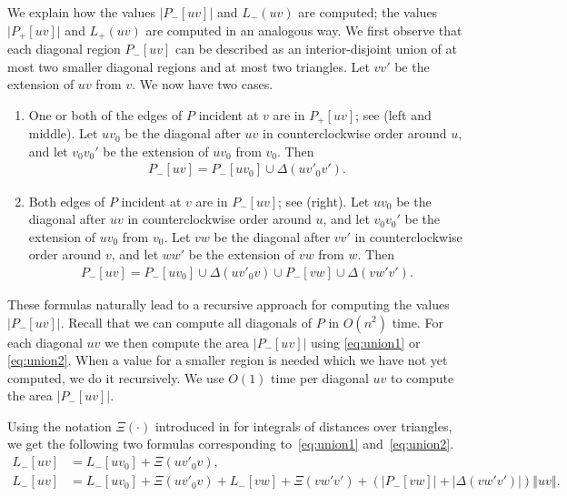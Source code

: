 \documentclass{article}
\begin{document}
We explain how the values $\vert P_-[uv]\vert$ and $L_-(uv)$ are computed; the values $\vert P_+[uv]\vert$ and $L_+(uv)$ are computed in an analogous way.
We first observe that each diagonal region $P_-[uv]$ can be described as an interior-disjoint union of at most two smaller diagonal regions and at most two triangles.
Let $vv'$ be the extension of $uv$ from $v$.
We now have two cases.
\begin{enumerate}
\item One or both of the edges of $P$ incident at $v$ are in $P_+[uv]$; see  (left and middle).
Let $uv_0$ be the diagonal after $uv$ in counterclockwise order around $u$, and let $v_0v_0'$ be the extension of $uv_0$ from $v_0$.
Then
\begin{align}
P_-[uv]=P_-[uv_0]\cup \Delta(uv'_0v').\label{eq:union1}
\end{align}

\item Both edges of $P$ incident at $v$ are in $P_-[uv]$; see  (right).
Let $uv_0$ be the diagonal after $uv$ in counterclockwise order around $u$, and let $v_0v_0'$ be the extension of $uv_0$ from $v_0$.
Let $vw$ be the diagonal after $vv'$ in counterclockwise order around $v$, and let $ww'$ be the extension of $vw$ from $w$.
Then
\begin{align}
P_-[uv]=P_-[uv_0]\cup \Delta(uv'_0v)\cup P_-[vw]\cup \Delta(vw'v').\label{eq:union2}
\end{align}
\end{enumerate}

These formulas naturally lead to a recursive approach for computing the values $\vert P_-[uv]\vert$.
Recall that we can compute all diagonals of $P$ in $O(n^2)$ time.
For each diagonal $uv$ we then compute the area $\vert P_-[uv]\vert$ using \eqref{eq:union1} or \eqref{eq:union2}.
When a value for a smaller region is needed which we have not yet computed, we do it recursively.
We use $O(1)$ time per diagonal $uv$ to compute the area $\vert P_-[uv]\vert$.

Using the notation $\Xi(\cdot)$ introduced in  for integrals of distances over triangles, we get the following two formulas corresponding to~\eqref{eq:union1} and~\eqref{eq:union2}.
\begin{align}
L_-[uv] & =L_-[uv_0] + \Xi(uv'_0v), \label{eq:computeLint1} \\
L_-[uv] & =
L_-[uv_0] + \Xi(uv'_0v)+
L_-[vw]+
\Xi(vw'v')+
(\left\vert P_-[vw]\right\vert +
\left\vert \Delta(vw'v')\right\vert) \left\Vert uv\right\Vert.\label{eq:computeLint2}
\end{align}
\end{document}
